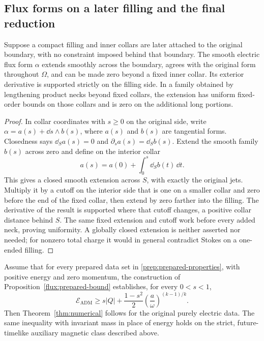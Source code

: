 \subsection{Flux forms on a later filling and the final reduction}

\begin{lemma}
\label{prep:source-extension}
Suppose a compact filling and inner collars are later attached to the
original boundary, with no constraint imposed behind that boundary.
The smooth electric flux form $\alpha$ extends smoothly across the
boundary, agrees with the original form throughout $\Omega$, and can
be made zero beyond a fixed inner collar.  Its exterior derivative is
supported strictly on the filling side.  In a family obtained by
lengthening product necks beyond fixed collars, the extension has
uniform fixed-order bounds on those collars and is zero on the
additional long portions.
\end{lemma}

\begin{proof}
In collar coordinates with $s\geq0$ on the original side, write
$\alpha=a(s)+\dd s\wedge b(s)$, where $a(s)$ and $b(s)$ are tangential
forms.  Closedness says $\dd_Sa(s)=0$ and
$\partial_sa(s)=\dd_Sb(s)$.  Extend the smooth family $b(s)$ across
zero and define on the interior collar
\[
 a(s)=a(0)+\int_0^s\dd_Sb(t)\,\dd t.
\]
This gives a closed smooth extension across $S$, with exactly the
original jets.  Multiply it by a cutoff on the interior side that is
one on a smaller collar and zero before the end of the fixed collar,
then extend by zero farther into the filling.  The derivative of the
result is supported where that cutoff changes, a positive collar
distance behind $S$.  The same fixed extension and cutoff work before
every added neck, proving uniformity.  A globally closed extension is
neither asserted nor needed; for nonzero total charge it would in
general contradict Stokes on a one-ended filling.
\end{proof}

\begin{proposition}
\label{prep:prepared-reduction}
Assume that for every prepared data set in
\eqref{prep:prepared-properties}, with positive energy and zero
momentum, the construction of Proposition~\ref{flux:prepared-bound}
establishes, for every $0<s<1$,
\begin{equation}
 \label{prep:prepared-bound-hypothesis}
 \mathcal E_{\mathrm{ADM}}
 \geq s|Q|+\frac{1-s^2}{2}
                    \left(\frac{a}{\omega}\right)^{(k-1)/k}.
\end{equation}
Then Theorem~\ref{thm:numerical} follows for the original purely electric
data.  The same inequality with invariant mass in place of energy
holds on the strict, future-timelike auxiliary magnetic class described
above.
\end{proposition}

